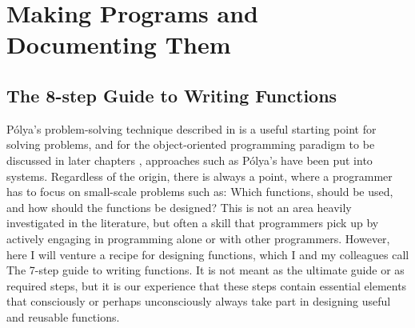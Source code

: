 \documentclass[fsharpNotes.tex]{subfiles}
\begin{document}
\chapter{Making Programs and Documenting Them}


\section{The 8-step Guide to Writing Functions}
\label{sec:8step}
Pólya's problem-solving technique described in  is a useful starting point for solving problems, and for the object-oriented programming paradigm to be discussed in later chapters , approaches such as Pólya's have been put into systems. Regardless of the origin, there is always a point, where a programmer has to focus on small-scale problems such as: Which functions, should be used, and how should the functions be designed? This is not an area heavily investigated in the literature, but often a skill that programmers pick up by actively engaging in programming alone or with other programmers. However, here I will venture a recipe for designing functions, which I and my colleagues call The 7-step guide to writing functions. It is not meant as the ultimate guide or as required steps, but it is our experience that these steps contain essential elements that consciously or perhaps unconsciously always take part in designing useful and reusable functions.
\end{document}
